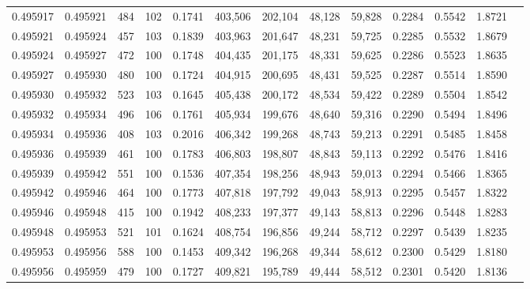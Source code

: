 \begin{tabular}{rrrrrrrrrrrrr}
0.495917 & 0.495921 &   484 & 102 &                                     0.1741 & 403,506 & 202,104 &  48,128 &  59,828 & 0.2284 & 0.5542 & 1.8721 \\
0.495921 & 0.495924 &   457 & 103 &                                     0.1839 & 403,963 & 201,647 &  48,231 &  59,725 & 0.2285 & 0.5532 & 1.8679 \\
0.495924 & 0.495927 &   472 & 100 &                                     0.1748 & 404,435 & 201,175 &  48,331 &  59,625 & 0.2286 & 0.5523 & 1.8635 \\
0.495927 & 0.495930 &   480 & 100 &                                     0.1724 & 404,915 & 200,695 &  48,431 &  59,525 & 0.2287 & 0.5514 & 1.8590 \\
0.495930 & 0.495932 &   523 & 103 &                                     0.1645 & 405,438 & 200,172 &  48,534 &  59,422 & 0.2289 & 0.5504 & 1.8542 \\
0.495932 & 0.495934 &   496 & 106 &                                     0.1761 & 405,934 & 199,676 &  48,640 &  59,316 & 0.2290 & 0.5494 & 1.8496 \\
0.495934 & 0.495936 &   408 & 103 &                                     0.2016 & 406,342 & 199,268 &  48,743 &  59,213 & 0.2291 & 0.5485 & 1.8458 \\
0.495936 & 0.495939 &   461 & 100 &                                     0.1783 & 406,803 & 198,807 &  48,843 &  59,113 & 0.2292 & 0.5476 & 1.8416 \\
0.495939 & 0.495942 &   551 & 100 &                                     0.1536 & 407,354 & 198,256 &  48,943 &  59,013 & 0.2294 & 0.5466 & 1.8365 \\
0.495942 & 0.495946 &   464 & 100 &                                     0.1773 & 407,818 & 197,792 &  49,043 &  58,913 & 0.2295 & 0.5457 & 1.8322 \\
0.495946 & 0.495948 &   415 & 100 &                                     0.1942 & 408,233 & 197,377 &  49,143 &  58,813 & 0.2296 & 0.5448 & 1.8283 \\
0.495948 & 0.495953 &   521 & 101 &                                     0.1624 & 408,754 & 196,856 &  49,244 &  58,712 & 0.2297 & 0.5439 & 1.8235 \\
0.495953 & 0.495956 &   588 & 100 &                                     0.1453 & 409,342 & 196,268 &  49,344 &  58,612 & 0.2300 & 0.5429 & 1.8180 \\
0.495956 & 0.495959 &   479 & 100 &                                     0.1727 & 409,821 & 195,789 &  49,444 &  58,512 & 0.2301 & 0.5420 & 1.8136 \\

\end{tabular}
